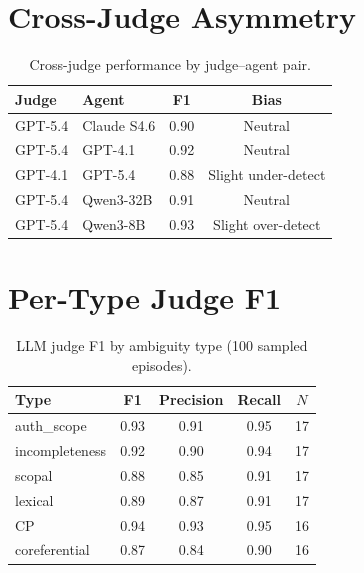 \documentclass[11pt]{article}
\begin{document}
\section{Cross-Judge Asymmetry}
\label{app:cross_judge}

\begin{table}[h]
\centering
\small
\caption{Cross-judge performance by judge--agent pair.}
\label{tab:cross_judge}
\begin{tabular}{llcc}
\toprule
\textbf{Judge} & \textbf{Agent} & \textbf{F1} & \textbf{Bias} \\
\midrule
GPT-5.4 & Claude S4.6 & 0.90 & Neutral \\
GPT-5.4 & GPT-4.1 & 0.92 & Neutral \\
GPT-4.1 & GPT-5.4 & 0.88 & Slight under-detect \\
GPT-5.4 & Qwen3-32B & 0.91 & Neutral \\
GPT-5.4 & Qwen3-8B & 0.93 & Slight over-detect \\
\bottomrule
\end{tabular}
\end{table}

\section{Per-Type Judge F1}
\label{app:per_type_judge}

\begin{table}[h]
\centering
\small
\caption{LLM judge F1 by ambiguity type (100 sampled episodes).}
\label{tab:per_type_judge}
\begin{tabular}{lcccc}
\toprule
\textbf{Type} & \textbf{F1} & \textbf{Precision} & \textbf{Recall} & \textbf{$N$} \\
\midrule
auth\_scope & 0.93 & 0.91 & 0.95 & 17 \\
incompleteness & 0.92 & 0.90 & 0.94 & 17 \\
scopal & 0.88 & 0.85 & 0.91 & 17 \\
lexical & 0.89 & 0.87 & 0.91 & 17 \\
CP & 0.94 & 0.93 & 0.95 & 16 \\
coreferential & 0.87 & 0.84 & 0.90 & 16 \\
\bottomrule
\end{tabular}
\end{table}
\end{document}
